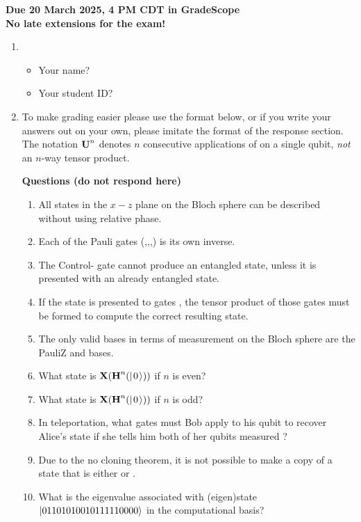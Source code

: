 \documentclass[12pt]{article}
\begin{document}

\begin{center}\bf
Due 20 March 2025, 4 PM CDT in GradeScope\\
No late extensions for the exam!
\end{center}

\begin{enumerate}
    \item \begin{itemize}
    \item Your name? \Blank[3in]{}
    \item Your student ID? \Blank[3in]{}
\end{itemize}

\item {} To make grading easier please use the format below, or if you write your answers out on your own, please imitate the format of the response section.  The notation $\mbox{\bfseries{\textrm{U}}}^{n}$ denotes $n$ consecutive applications of  on a single qubit, \emph{not} an $n$-way tensor product.

\textbf{Questions (do not respond here)}
\begin{enumerate}[label=\theenumi.\arabic*]
   \item\label{tf:a} All states in the $x-z$ plane on the Bloch sphere can be described without using relative phase.
   \item\label{tf:b} Each of the Pauli gates (\PauliX,\PauliY,\PauliZ,\Hadamard) is its own inverse.
   \item\label{tf:c} The Control-\PauliZ{} gate cannot produce an entangled state, unless it is presented with an already entangled state.
   \item\label{tf:d} If the state  is presented to gates \TensProd{\Hadamard}{\PauliX}, the tensor product of those gates must be formed to compute the correct resulting state.
   \item\label{tf:e} The only valid bases in terms of measurement on the Bloch sphere are the PauliZ{} and \PauliX{} bases.
   \item\label{tf:f} What state is $\PauliX(\Hadamard^{n}(\QZero))$ if $n$ is even?
      \item\label{tf:g} What state is $\PauliX(\Hadamard^{n}(\QZero))$ if $n$ is odd?
    \item\label{tf:h} In teleportation, what gates must Bob apply to his qubit to recover Alice's state if she tells him both of her qubits measured \QOne{}?
    \item\label{tf:i} Due to the no cloning theorem, it is not possible to make a copy of a state that is either \QZero{} or \QOne{}.
    \item\label{tf:j} What is the eigenvalue associated with (eigen)state $\ket{01101010010111110000}$ in the computational basis?
\end{enumerate}


\end{enumerate}
\end{document}
